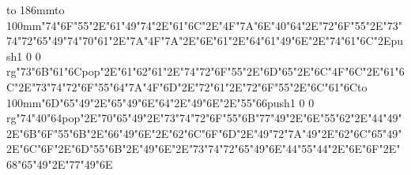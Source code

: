\hbox to 186mm{\hsize=81mm\vbox to 100mm{\vfill\ipa\char"74\ipa\char"6F\ipa\char"55\ipa\char"2E\ipa\char"61\ipa\char"49\ipa\char"74\ipa\char"2E\ipa\char"61\ipa\char"6C\ipa\char"2E\ipa\char"4F\ipa\char"7A\medskip\ipa\char"6E\ipa\char"40\ipa\char"64\ipa\char"2E\ipa\char"72\ipa\char"6F\ipa\char"55\ipa\char"2E\ipa\char"73\ipa\char"74\ipa\char"72\ipa\char"65\ipa\char"49\ipa\char"74\medskip\ipa\char"70\ipa\char"61\ipa\char"2E\ipa\char"7A\ipa\char"4F\ipa\char"7A\ipa\char"2E\ipa\char"6E\ipa\char"61\ipa\char"2E\ipa\char"64\ipa\char"61\ipa\char"49\ipa\char"6E\ipa\char"2E\ipa\char"74\ipa\char"61\ipa\char"6C\ipa\char"2E\pdfcolorstack\match push{1 0 0 rg}\ipa\char"73\ipa\char"6B\ipa\char"61\ipa\char"6C\pdfcolorstack\match pop{}\ipa\char"2E\ipa\char"61\ipa\char"62\medskip\ipa\char"61\ipa\char"2E\ipa\char"74\ipa\char"72\ipa\char"6F\ipa\char"55\ipa\char"2E\ipa\char"6D\ipa\char"65\ipa\char"2E\ipa\char"6C\ipa\char"4F\ipa\char"6C\ipa\char"2E\ipa\char"61\ipa\char"6C\ipa\char"2E\ipa\char"73\ipa\char"74\ipa\char"72\ipa\char"6F\ipa\char"55\ipa\char"64\medskip\ipa\char"7A\ipa\char"4F\ipa\char"6D\ipa\char"2E\ipa\char"72\ipa\char"61\ipa\char"2E\ipa\char"72\ipa\char"6F\ipa\char"55\ipa\char"2E\ipa\char"6C\ipa\char"61\ipa\char"6C\vfill}\hfill\vbox to 100mm{\vfill\ipa\char"6D\ipa\char"65\ipa\char"49\ipa\char"2E\ipa\char"65\ipa\char"49\ipa\char"6E\ipa\char"64\ipa\char"2E\ipa\char"49\ipa\char"6E\ipa\char"2E\ipa\char"55\ipa\char"66\medskip\pdfcolorstack\match push{1 0 0 rg}\ipa\char"74\ipa\char"40\ipa\char"64\pdfcolorstack\match pop{}\ipa\char"2E\ipa\char"70\ipa\char"65\ipa\char"49\ipa\char"2E\ipa\char"73\ipa\char"74\ipa\char"72\ipa\char"6F\ipa\char"55\ipa\char"6B\medskip\ipa\char"77\ipa\char"49\ipa\char"2E\ipa\char"6E\ipa\char"55\ipa\char"62\ipa\char"2E\ipa\char"44\ipa\char"49\ipa\char"2E\ipa\char"6B\ipa\char"6F\ipa\char"55\ipa\char"6B\ipa\char"2E\ipa\char"66\ipa\char"49\ipa\char"6E\ipa\char"2E\ipa\char"62\ipa\char"6C\ipa\char"6F\ipa\char"6D\ipa\char"2E\ipa\char"49\ipa\char"72\ipa\char"7A\medskip\ipa\char"49\ipa\char"2E\ipa\char"62\ipa\char"6C\ipa\char"65\ipa\char"49\ipa\char"2E\ipa\char"6C\ipa\char"6F\ipa\char"2E\ipa\char"6D\ipa\char"55\ipa\char"6B\ipa\char"2E\ipa\char"49\ipa\char"6E\ipa\char"2E\ipa\char"73\ipa\char"74\ipa\char"72\ipa\char"65\ipa\char"49\ipa\char"6E\medskip\ipa\char"44\ipa\char"55\ipa\char"44\ipa\char"2E\ipa\char"6E\ipa\char"6F\ipa\char"2E\ipa\char"68\ipa\char"65\ipa\char"49\ipa\char"2E\ipa\char"77\ipa\char"49\ipa\char"6E\vfill}}\eject
\bye